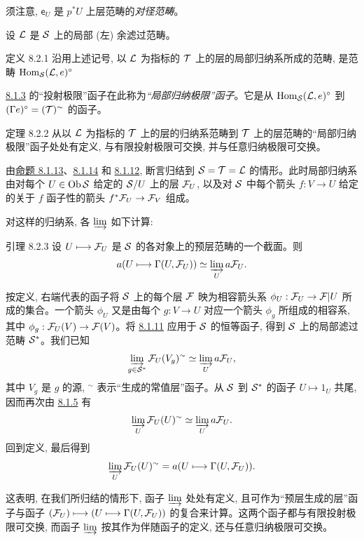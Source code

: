 须注意, $\mathsf{e}_U$ 是 $p^{\ast}U$ 上层范畴的\emph{对径范畴}。

设 ${\mathcal L}$ 是 ${\mathcal S}$ 上的局部 (左) 余滤过范畴。

\begin{enonce*}{定义 8.2.1}
沿用上述记号, 以 ${\mathcal L}$ 为指标的 ${\mathcal T}$ 上的层的局部归纳系所成的范畴, 是范畴
$\operatorname{Hom}_{{\mathcal S}}({\mathcal L},{e})^{\circ}$
\end{enonce*}

\hyperref[V.def8.1.3]{8.1.3} 的“投射极限”函子在此称为\emph{“局部归纳极限”函子}。它是从 $\operatorname{Hom}_{{\mathcal S}}({\mathcal L},{e})^{\circ}$ 到 $(\Gamma{e})^{\circ}=({\mathcal T})^{\sim}$ 的函子。

\begin{enonce*}{定理 8.2.2}
从以 ${\mathcal L}$ 为指标的 ${\mathcal T}$ 上的层的归纳系范畴到 ${\mathcal T}$ 上的层范畴的“局部归纳极限”函子处处有定义, 与有限投射极限可交换, 并与任意归纳极限可交换。
\end{enonce*}

由\pageoriginale \hyperref[V.prop8.1.13.1]{命题 8.1.13}、\hyperref[V.prop8.1.14]{8.1.14} 和 \hyperref[V.prop8.1.12]{8.1.12}, 断言归结到 ${\mathcal S}={\mathcal T}={\mathcal L}$ 的情形。此时局部归纳系由对每个 $U\in\operatorname{Ob}{\mathcal S}$ 给定的 ${\mathcal S}/U$ 上的层 ${\mathcal F}_U$, 以及对 ${\mathcal S}$ 中每个箭头 $f:V\to U$ 给定的关于 $f$ 函子性的箭头 $f^{\ast}\Ff_U\to\Ff_V$ 组成。

对这样的归纳系, 各 $\varinjlim$ 如下计算:

\begin{enonce*}{引理 8.2.3}
设 $U\longmapsto{\mathcal F}_U$ 是 ${\mathcal S}$ 的各对象上的预层范畴的一个截面。则
$$
a(U\longmapsto\Gamma(U,{\mathcal F}_U))\simeq
\varinjlim_U a{\mathcal F}_U{}.
$$
\end{enonce*}

按定义, 右端代表的函子将 ${\mathcal S}$ 上的每个层 ${\mathcal F}$ 映为相容箭头系 $\phi_U:\Ff_U\to\Ff|U$ 所成的集合。一个箭头 $\phi_U$ 又是由每个 $g:V\to U$ 对应一个箭头 $\phi_g$ 所组成的相容系, 其中 $\phi_g:\Ff_U(V)\to\Ff(V)$。将 \hyperref[V.lem8.1.11]{8.1.11} 应用于 ${\mathcal S}$ 的恒等函子, 得到 ${\mathcal S}$ 上的局部滤过范畴 ${\mathcal S}^{\ast}$。我们已知
$$
\varinjlim_{g\in{\mathcal S}^{\ast}}{\mathcal F}_U(V_g)^{\sim}
\simeq\varinjlim_U a{\mathcal F}_U{},
$$
其中 $V_g$ 是 $g$ 的源, ${}^{\sim}$ 表示“生成的常值层”函子。从 ${\mathcal S}$ 到 ${\mathcal S}^{\ast}$ 的函子 $U\longmapsto1_U$ 共尾, 因而再次由 \hyperref[V.prop8.1.5]{8.1.5} 有
$$
\varinjlim_U{\mathcal F}_U(U)^{\sim}\simeq
\varinjlim_U a{\mathcal F}_U{}.
$$
回到定义, 最后得到
$$
\varinjlim_U{\mathcal F}_U(U)^{\sim}
=a(U\longmapsto\Gamma(U,{\mathcal F}_U)){}.
$$

这表明, 在我们所归结的情形下, 函子 $\varinjlim$ 处处有定义, 且可作为“预层生成的层”函子与函子 $({\mathcal F}_U)\longmapsto(U\longmapsto\Gamma(U,{\mathcal F}_U))$ 的复合来计算。这两个函子都与有限投射极限可交换, 而函子 $\varinjlim$ 按其作为伴随函子的定义, 还与任意归纳极限可交换。

